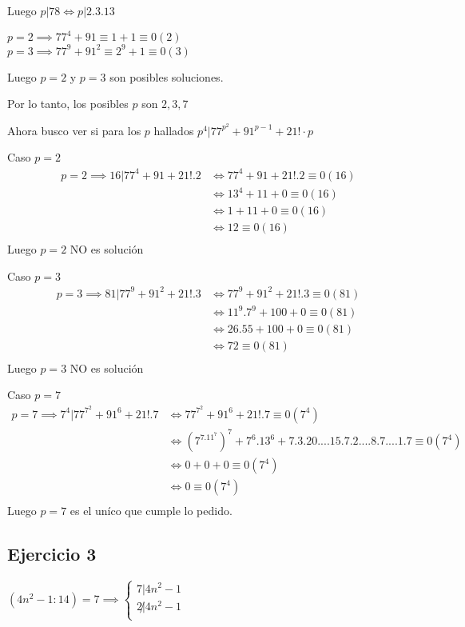 Luego $ p |78 \iff p|2.3.13 $

$ p = 2 \implies 77^4 + 91 \equiv 1 + 1 \equiv 0 (2) $ \\
$ p = 3 \implies 77^9 + 91^2 \equiv 2^9 + 1 \equiv 0 (3) $

Luego $ p = 2 $ y $ p = 3 $ son posibles soluciones.

Por lo tanto, los posibles $p$ son $ 2, 3, 7 $

Ahora busco ver si para los $p$ hallados $ p^4 | 77^{p^2} + 91^{p-1} + 21! \cdot p $

Caso $ p = 2 $
\begin{align*}
    p = 2 \implies 16 | 77^4 + 91 + 21! .2 &\iff 77^4 + 91 + 21! .2 \equiv 0 (16) \\
    &\iff 13^4 + 11 + 0 \equiv 0 (16) \\
    &\iff 1 + 11 + 0 \equiv 0 (16) \\
    &\iff 12 \equiv 0 (16) \\
\end{align*}
Luego $ p = 2 $ NO es solución

Caso $ p = 3 $
\begin{align*}
    p = 3 \implies 81 | 77^9 + 91^2 + 21! .3 &\iff 77^9 + 91^2 + 21! .3 \equiv 0 (81) \\
    &\iff 11^9. 7^9 + 100 + 0 \equiv 0 (81) \\
    &\iff 26. 55 + 100 + 0 \equiv 0 (81) \\
    &\iff 72 \equiv 0 (81) \\
\end{align*}
Luego $ p = 3 $ NO es solución

Caso $ p = 7 $
\begin{align*}
    p = 7 \implies 7^4 | 77^{7^2} + 91^6 + 21! .7 &\iff 77^{7^2} + 91^6 + 21! .7 \equiv 0 (7^4) \\
    &\iff (7^7.11^7)^{7} + 7^6. 13^6 + 7.3.20....15.7.2....8.7....1 .7 \equiv 0 (7^4) \\
    &\iff 0 + 0 + 0 \equiv 0 (7^4) \\
    &\iff 0 \equiv 0 (7^4) \\
\end{align*}
Luego $ p = 7 $ es el uníco que cumple lo pedido.

\subsection{Ejercicio 3}

$ (4n^2 - 1:14) = 7 \implies \begin{cases}
    7 | 4n^2 - 1 \\
    2 \not | 4n^2 - 1 \\
\end{cases} $

